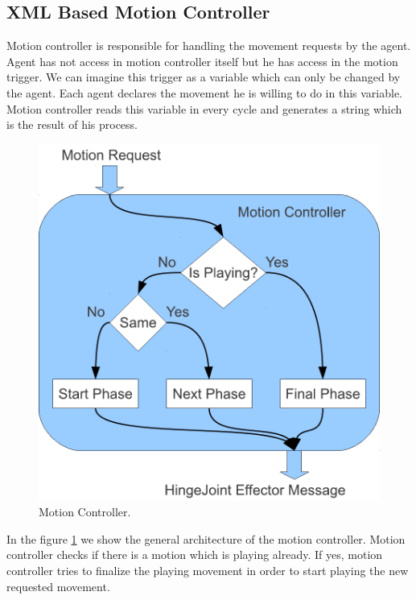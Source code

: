 \subsection{XML Based Motion Controller}
Motion controller is responsible for handling the movement requests by the agent. Agent has not access in motion controller itself but he has access in the motion trigger. We can imagine this trigger as a variable which can only be changed by the agent. Each agent declares the movement he is willing to do in this variable.
Motion controller reads this variable in every cycle and generates a string which is the result of his process.
\begin{figure}[htb!]
\centering
  \includegraphics[scale=0.6]{Chapter3/figures/MotionController.pdf}
  \caption{Motion Controller.}
  \label{fig:MotionController}
\end{figure}
In the figure \ref{fig:MotionController} we show the general architecture of the motion controller. Motion controller checks if there is a motion which is playing already. If yes, motion controller tries to finalize the playing movement in order to start playing the new requested movement.
